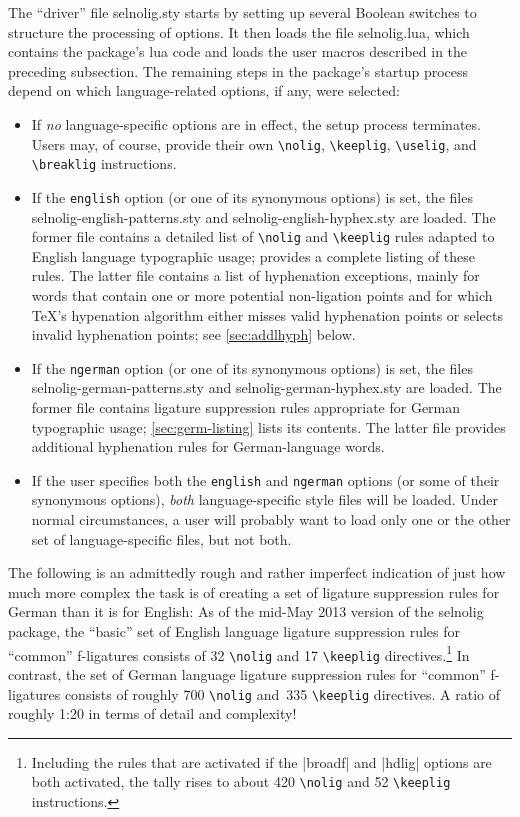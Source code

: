 \documentclass[11pt]{article}
\newcommand{\pkg}[1]{\textsf{#1}}
\newcommand{\opt}[1]{\texttt{#1}}
\newcommand{\cmmd}[1]{\texttt{\textbackslash #1}}
\begin{document}
The \enquote{driver} file \pkg{selnolig.sty} starts by setting up several Boolean switches to structure the processing of options. It then loads the file \pkg{selnolig.lua}, which contains the package's lua code and loads the user macros described in the preceding subsection. The remaining steps in the package's startup process depend on which language-related options, if any, were selected:
\begin{itemize}
\item If \emph{no} language-specific options are in effect, the setup process terminates. Users may, of course, provide their own \cmmd{nolig}, \cmmd{keeplig}, \cmmd{uselig}, and \cmmd{breaklig} instructions.

\item If the \opt{english} option (or one of its synonymous options) is set, the files \pkg{selnolig-english-patterns.sty} and \pkg{selnolig-english-hyphex.sty} are loaded. The former file contains a detailed list of \cmmd{nolig} and \cmmd{keeplig} rules adapted to English language typographic usage;  provides a complete listing of these rules. The latter file contains a list of hyphenation exceptions, mainly for words that contain one or more potential non-ligation points and for which \TeX's hypenation algorithm either misses valid hyphenation points or selects invalid hyphenation points; see \cref{sec:addlhyph} below.

\item If the \opt{ngerman} option (or one of its synonymous options) is set, the files \pkg{selnolig-german-patterns.sty} and \pkg{selnolig-german-hyphex.sty} are loaded. The former file contains ligature suppression rules appropriate for German typographic usage; \cref{sec:germ-listing} lists its contents. The latter file provides additional hyphenation rules for German-language words.

\item If the user specifies both the \opt{english} and \opt{ngerman} options (or some of their synonymous options), \emph{both} language-specific style files will be loaded. Under normal circumstances, a user will probably want to load only one or the other set of language-specific files, but not both.
\end{itemize}

The following is an admittedly rough and rather imperfect indication of just how much more complex the task is of creating a set of ligature suppression rules for German than it is for English: As of the mid-May 2013 version of the \pkg{selnolig} package, the \enquote{basic} set of English language ligature suppression rules for \enquote{common} f-ligatures consists of 32 \cmmd{nolig} and 17 \cmmd{keeplig} directives.\footnote{Including the rules that are activated if the |broadf| and |hdlig| options are both activated, the tally rises to about 420 \cmmd{nolig} and 52 \cmmd{keeplig} instructions.} In contrast, the set of German language ligature suppression rules for \enquote{common} f-ligatures consists of roughly 700 \cmmd{nolig} and~335 \cmmd{keeplig} directives. A ratio of roughly 1:20 in terms of detail and complexity!
\end{document}

